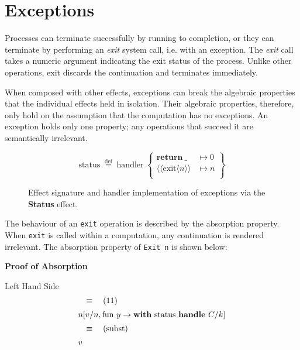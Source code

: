 \documentclass[logo,bsc,singlespacing,parskip]{infthesis}
\begin{document}
\vspace{-1em}
\section{Exceptions}
Processes can terminate successfully by running to completion, or they can terminate by performing an \textit{exit} system call, i.e. with an exception. The \textit{exit} call takes a numeric argument indicating the exit status of the process. Unlike other operations, exit discards the continuation and terminates immediately.

When composed with other effects, exceptions can break the algebraic properties that the individual effects held in isolation. Their algebraic properties, therefore, only hold on the assumption that the computation has no exceptions. An exception holds only one property; any operations that succeed it are semantically irrelevant.

\begin{figure}[H]
\centering


\vspace{-1em}

\[
\mathrm{status} \;\overset{\mathrm{def}}{=}\;
\mathrm{handler} \;\left\{
\begin{array}{ll}
  \mathrm{\textbf{return}\:\_} & \mapsto 0 \\[0.5ex]
  \langle\!\langle \mathrm{exit} \langle n\rangle\rangle & \mapsto n \\[0.5ex]
\end{array}
\right\}
\]

\caption{Effect signature and handler implementation of exceptions via the \textbf{Status} effect.}
\label{fig:status-handler}
\end{figure}


The behaviour of an \lstinline{exit} operation is described by the absorption property. When \lstinline{exit} is called within a computation, any continuation is rendered irrelevant. The absorption property of \lstinline{Exit n} is shown below:



{\large \textbf{Proof of Absorption}}

{Left Hand Side}
\vspace{0em}
\[
\begin{array}{l}
\quad\equiv\quad (11) \\[5pt]
n [v/n, \text{fun } y \rightarrow \text{\textbf{with} status \textbf{handle} } C/k] \\[5pt]
\quad\equiv\quad (\text{subst}) \\[5pt]
v
\end{array}
\]
\end{document}
